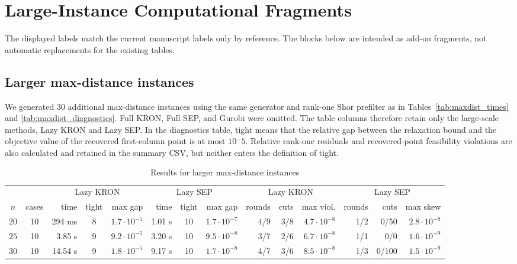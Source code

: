 \documentclass[11pt]{article}
\begin{document}
\section*{Large-Instance Computational Fragments}

The displayed labels match the current manuscript labels only by reference.
The blocks below are intended as add-on fragments, not automatic replacements
for the existing tables.

\subsection*{Larger max-distance instances}

\noindent We generated 30 additional max-distance instances using the same generator
and rank-one Shor prefilter as in Tables~\ref{tab:maxdist_times} and
\ref{tab:maxdist_diagnostics}.  Full KRON, Full SEP, and Gurobi were omitted.
The table columns therefore retain only the large-scale methods, Lazy KRON and
Lazy SEP.  In the diagnostics table, tight means that the relative gap between
the relaxation bound and the objective value of the recovered first-column
point is at most \(10^-5\).  Relative rank-one residuals and recovered-point
feasibility violations are also calculated and retained in the summary CSV,
but neither enters the definition of tight.


\begin{table}[htbp]
\centering
\caption{Results for larger max-distance instances}
\label{tab:maxdist_larger}
\vskip 10pt
\begingroup
\setlength{\tabcolsep}{2.5pt}
\small
\begin{tabular}{c c|r c r|r c r|r r r|r r r}
\hline
& &\multicolumn{3}{c|}{Lazy KRON} & \multicolumn{3}{c|}{Lazy SEP} & \multicolumn{3}{c|}{Lazy KRON} & \multicolumn{3}{c}{Lazy SEP} \\
$n$& cases& time &tight & max gap & time &tight & max gap & rounds & cuts & max viol. & rounds & cuts & max skew \\
\hline
$20$ &10&294 ms & 8 & $1.7\cdot 10^{-5}$ & 1.01 s &10 & $1.7\cdot 10^{-7}$ & 4/9 & 3/8 & $4.7\cdot 10^{-8}$ & 1/2 & 0/50 & $2.8\cdot 10^{-8}$ \\
$25$ &10&3.85 s & 9 & $9.2\cdot 10^{-5}$ & 3.20 s &10 & $9.5\cdot 10^{-8}$ & 3/7 & 2/6 & $6.7\cdot 10^{-8}$ & 1/1 & 0/0 & $1.6\cdot 10^{-9}$ \\
$30$ &10&14.54 s & 9 & $1.8\cdot 10^{-5}$ & 9.17 s &10 & $1.7\cdot 10^{-8}$ & 4/7 & 3/6 & $8.5\cdot 10^{-8}$ & 1/3 & 0/100 & $1.5\cdot 10^{-9}$ \\
\hline
\hline
\end{tabular}
\endgroup
\end{table}
\end{document}
